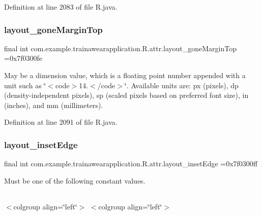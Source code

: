 Definition at line 2083 of file R.\+java.

\mbox{\label{classcom_1_1example_1_1trainawearapplication_1_1_r_1_1attr_a5dda0b6666992179df463c28f5c4e3f2}} 
\subsubsection{\texorpdfstring{layout\_goneMarginTop}{layout\_goneMarginTop}}
{\footnotesize\ttfamily final int com.\+example.\+trainawearapplication.\+R.\+attr.\+layout\+\_\+gone\+Margin\+Top =0x7f0300fe\hspace{0.3cm}{\ttfamily [static]}}

May be a dimension value, which is a floating point number appended with a unit such as \char`\"{}$<$code$>$14.\+5sp$<$/code$>$\char`\"{}. Available units are\+: px (pixels), dp (density-\/independent pixels), sp (scaled pixels based on preferred font size), in (inches), and mm (millimeters). 

Definition at line 2091 of file R.\+java.

\mbox{\label{classcom_1_1example_1_1trainawearapplication_1_1_r_1_1attr_abcd6d7e80e8f9c8a04df76b311da8601}} 
\subsubsection{\texorpdfstring{layout\_insetEdge}{layout\_insetEdge}}
{\footnotesize\ttfamily final int com.\+example.\+trainawearapplication.\+R.\+attr.\+layout\+\_\+inset\+Edge =0x7f0300ff\hspace{0.3cm}{\ttfamily [static]}}

Must be one of the following constant values.

\tabulinesep=1mm
\begin{longtabu}spread 0pt [c]{*{0}{|X[-1]}|}
\hline
\end{longtabu}
$<$colgroup align=\char`\"{}left\char`\"{}$>$ $<$colgroup align=\char`\"{}left\char`\"{}$>$ 

